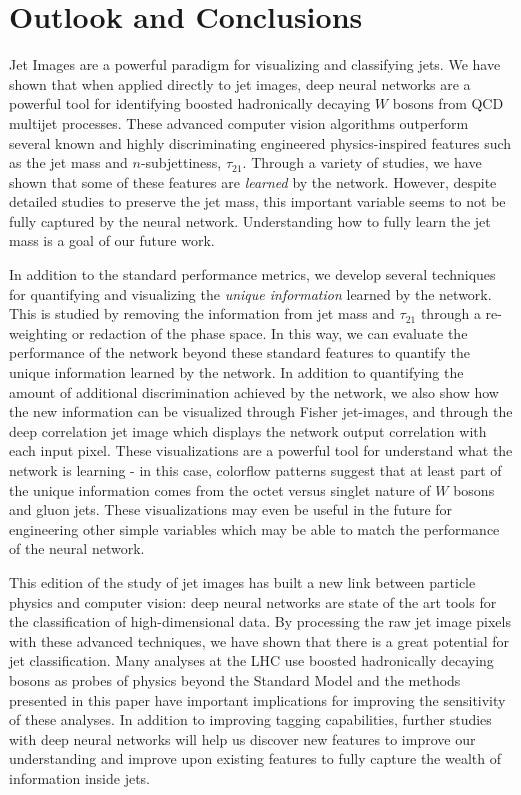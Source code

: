 \section{Outlook and Conclusions}
\label{sec:conclusion}
Jet Images are a powerful paradigm for visualizing and classifying jets.  We have shown that when applied directly to jet images, deep neural networks are a powerful tool for identifying boosted hadronically decaying $W$ bosons from QCD multijet processes.  These advanced computer vision algorithms outperform several known and highly discriminating engineered physics-inspired features such as the jet mass and $n$-subjettiness, $\tau_{21}$.  Through a variety of studies, we have shown that some of these features are {\it learned} by the network.  However, despite detailed studies to preserve the jet mass, this important variable seems to not be fully captured by the neural network.  Understanding how to fully learn the jet mass is a goal of our future work.

In addition to the standard performance metrics, we develop several techniques for quantifying and visualizing the {\it unique information} learned by the network.  This is studied by removing the information from jet mass and $\tau_{21}$ through a re-weighting or redaction of the phase space.  In this way, we can evaluate the performance of the network beyond these standard features to quantify the unique information learned by the network.  In addition to quantifying the amount of additional discrimination achieved by the network, we also show how the new information can be visualized through Fisher jet-images, and through the deep correlation jet image which displays the network output correlation with each input pixel.  These visualizations are a powerful tool for understand what the network is learning - in this case, colorflow patterns suggest that at least part of the unique information comes from the octet versus singlet nature of $W$ bosons and gluon jets.  These visualizations may even be useful in the future for engineering other simple variables which may be able to match the performance of the neural network.

This edition of the study of jet images has built a new link between particle physics and computer vision: deep neural networks are state of the art tools for the classification of high-dimensional data.  By processing the raw jet image pixels with these advanced techniques, we have shown that there is a great potential for jet classification.  Many analyses at the LHC use boosted hadronically decaying bosons as probes of physics beyond the Standard Model and the methods presented in this paper have important implications for improving the sensitivity of these analyses.  In addition to improving tagging capabilities, further studies with deep neural networks will help us discover new features to improve our understanding and improve upon existing features to fully capture the wealth of information inside jets.